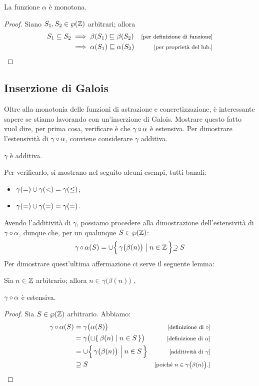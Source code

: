 \begin{proposizione}
La funzione $\alpha$ è monotona.
\end{proposizione}
\begin{proof}
Siano $S_1, S_2 \in \wp(\mathbb{Z})$ arbitrari; allora
  \begin{align*}
    S_1 \subseteq S_2
      &\implies \beta(S_1) \sqsubseteq \beta(S_2)
      &\law{per definizione di funzione} \\
      &\implies \alpha(S_1) \sqsubseteq \alpha(S_2)
      &\law{per proprietà del $\lub$.}
  \end{align*}
\end{proof}

\subsection{Inserzione di Galois}

Oltre alla monotonia delle funzioni di astrazione e concretizzazione,
è interessante sapere se stiamo lavorando con un'inserzione di Galois.
Mostrare questo fatto vuol dire, per prima cosa,
verificare è che $\mathrm{\gamma}\mathop{\circ}\mathrm{\alpha}$ è estensiva. 
Per dimostrare l'estensività di $\mathrm{\gamma}\mathop{\circ}\mathrm{\alpha}$, conviene
considerare $\gamma$ additiva.
\begin{proposizione}
$\gamma$ è additiva.
\end{proposizione}
Per verificarlo, si mostrano nel seguito alcuni esempi, tutti banali:
\begin{itemize}
  \item $\gamma(=) \cup \gamma(<) = \gamma(\leq)$;
  \item $\gamma(=) \cup \gamma(=) = \gamma(=)$.
\end{itemize}
Avendo l'additività di $\gamma$, possiamo procedere alla dimostrazione
dell'estensività di $\mathrm{\gamma}\mathop{\circ}\mathrm{\alpha}$, dunque che,
per un qualunque $S \in \wp(\mathbb{Z})$:
\[
  \mathrm{\gamma}\mathop{\circ}\mathrm{\alpha}(S) = \cup \Bigl\{\, \gamma\bigl(\beta(n)\bigr) \bigm| n \in \mathbb{Z} \,\Bigl\} \supseteq S
\]
Per dimostrare quest'ultima affermazione ci serve il seguente lemma:
\begin{lemma}
  Sia $n \in \mathbb{Z}$ arbitrario; allora
  $n \in \gamma\bigl(\beta(n)\bigr) $ ,
\end{lemma}

\begin{proposizione}
$\mathrm{\gamma}\mathop{\circ}\mathrm{\alpha}$ è estensiva.
\end{proposizione}
\begin{proof}
Sia $S \in \wp(\mathbb{Z})$ arbitrario.
Abbiamo:
\begin{align*}
  \compfun{\gamma}{\alpha}(S)
    &= \gamma\bigl(\alpha(S)\bigr)
    &\law{definizione di $\circ$} \\
    &= \gamma\bigl(\sqcup \{\, \beta(n) \mid n \in S \,\} \bigr)
    &\law{definizione di $\alpha$} \\
    &= \union \Bigl\{\, \gamma\bigl(\beta(n)\bigr) \Bigm| n \in S \,\Bigr\}
    &\law{additività di $\gamma$} \\
    &\supseteq S
    &\law{poiché $n \in \gamma\bigl(\beta(n)\bigr)$.}
\end{align*}
\end{proof}

